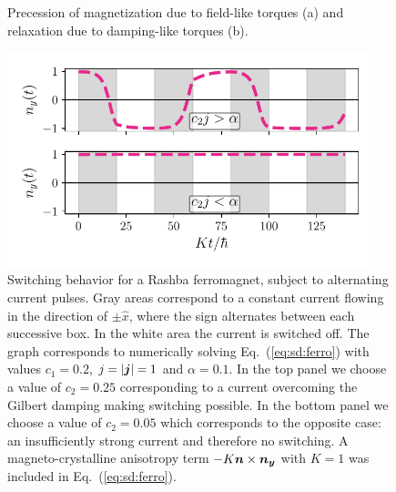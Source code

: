 \begin{figure}
    \centering
    \hspace{0.2\textwidth}
    \caption{Precession of magnetization due to field-like torques (a) and relaxation due to damping-like torques (b). }
    \label{fig:llg}
\end{figure}

\begin{figure}
    \centering
    \includegraphics[width=0.95\textwidth]{gfx/switch_ferro}
    \caption{Switching behavior for a Rashba ferromagnet, subject to alternating current pulses. Gray areas correspond to a constant current flowing in the direction of $\pm\hat{x}$, where the sign alternates between each successive box. In the white area the current is switched off. The graph corresponds to numerically solving Eq.~(\ref{eq:sd:ferro}) with values $c_1=0.2$, $j=|\boldsymbol{j}|=1$ and $\alpha=0.1$. In the top panel we choose a value of $c_2=0.25$ corresponding to a current overcoming the Gilbert damping making switching possible. In the bottom panel we choose a value of $c_2=0.05$ which corresponds to the opposite case: an insufficiently strong current and therefore no switching. A magneto-crystalline anisotropy term $-K \boldsymbol{n}\times\boldsymbol{n_y}$ with $K=1$ was included in Eq.~(\ref{eq:sd:ferro}).} 
    \label{fig:switching_ferro}
\end{figure}

